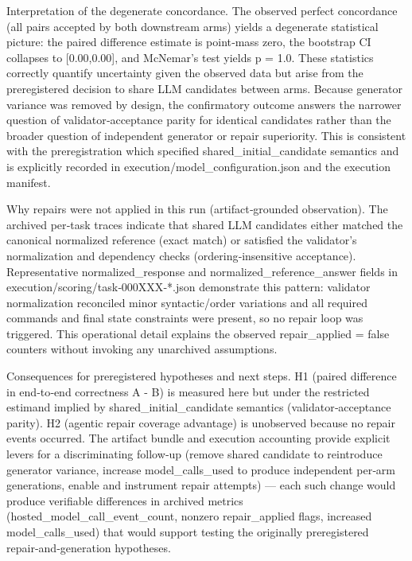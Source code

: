 \documentclass[conference]{IEEEtran}
\begin{document}
Interpretation of the degenerate concordance. The observed perfect concordance (all pairs accepted by both downstream arms) yields a degenerate statistical picture: the paired difference estimate is point‑mass zero, the bootstrap CI collapses to [0.00,0.00], and McNemar's test yields p = 1.0. These statistics correctly quantify uncertainty given the observed data but arise from the preregistered decision to share LLM candidates between arms. Because generator variance was removed by design, the confirmatory outcome answers the narrower question of validator‑acceptance parity for identical candidates rather than the broader question of independent generator or repair superiority. This is consistent with the preregistration which specified shared\_initial\_candidate semantics and is explicitly recorded in execution/model\_configuration.json and the execution manifest.

Why repairs were not applied in this run (artifact‑grounded observation). The archived per‑task traces indicate that shared LLM candidates either matched the canonical normalized reference (exact match) or satisfied the validator's normalization and dependency checks (ordering‑insensitive acceptance). Representative normalized\_response and normalized\_reference\_answer fields in execution/scoring/task‑000XXX‑*.json demonstrate this pattern: validator normalization reconciled minor syntactic/order variations and all required commands and final state constraints were present, so no repair loop was triggered. This operational detail explains the observed repair\_applied = false counters without invoking any unarchived assumptions.

Consequences for preregistered hypotheses and next steps. H1 (paired difference in end‑to‑end correctness A - B) is measured here but under the restricted estimand implied by shared\_initial\_candidate semantics (validator‑acceptance parity). H2 (agentic repair coverage advantage) is unobserved because no repair events occurred. The artifact bundle and execution accounting provide explicit levers for a discriminating follow‑up (remove shared candidate to reintroduce generator variance, increase model\_calls\_used to produce independent per‑arm generations, enable and instrument repair attempts) --- each such change would produce verifiable differences in archived metrics (hosted\_model\_call\_event\_count, nonzero repair\_applied flags, increased model\_calls\_used) that would support testing the originally preregistered repair‑and‑generation hypotheses.
\end{document}
